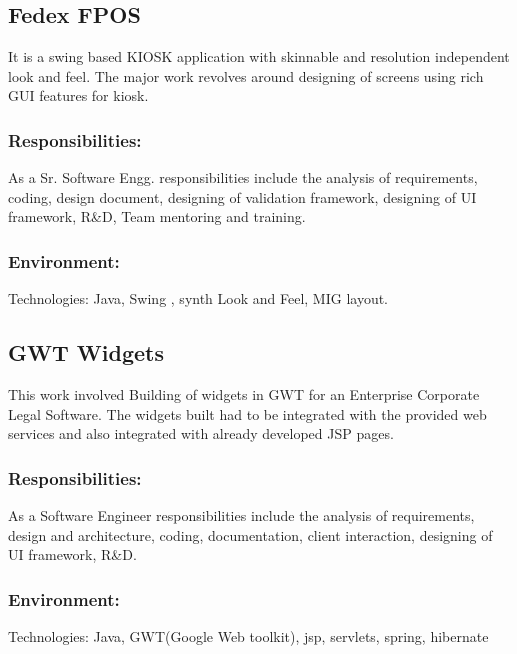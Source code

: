 \documentclass[letterpaper]{article}
\begin{document}
\subsection{Fedex FPOS}
\label{sec:orgheadline19}
It is a swing based KIOSK application with skinnable and resolution independent look and feel. The major work revolves around designing of screens using rich GUI features for kiosk.

\subsubsection{Responsibilities:}
\label{sec:orgheadline17}
As a Sr. Software Engg. responsibilities include the analysis of requirements, coding, design document, designing of validation framework, designing of UI framework, R\&D, Team mentoring and training.

\subsubsection{Environment:}
\label{sec:orgheadline18}
Technologies: Java, Swing , synth Look and Feel, MIG layout.

\subsection{GWT Widgets}
\label{sec:orgheadline22}
This work involved Building of widgets in GWT for an Enterprise Corporate Legal Software. The   widgets built had to be integrated with the provided web services and also integrated with already developed JSP pages.

\subsubsection{Responsibilities:}
\label{sec:orgheadline20}
As a Software Engineer responsibilities include the analysis of requirements, design and architecture, coding, documentation, client interaction, designing of UI framework, R\&D. 

\subsubsection{Environment:}
\label{sec:orgheadline21}
Technologies: Java, GWT(Google Web toolkit), jsp, servlets, spring, hibernate
\end{document}
